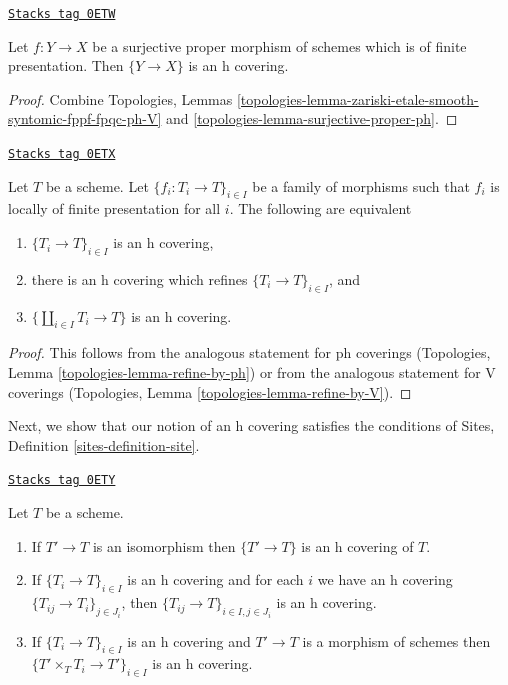 \begin{lemma}
\label{flat-lemma-surjective-proper-finite-presentation-h}
\href{https://stacks.math.columbia.edu/tag/0ETW}{\texttt{Stacks tag 0ETW}}

Let $f : Y \to X$ be a surjective proper morphism of schemes
which is of finite presentation. Then $\{Y \to X\}$ is an h covering.
\end{lemma}

\begin{proof}
Combine Topologies, Lemmas
\ref{topologies-lemma-zariski-etale-smooth-syntomic-fppf-fpqc-ph-V} and
\ref{topologies-lemma-surjective-proper-ph}.
\end{proof}

\begin{lemma}[Refine by h]
\label{flat-lemma-refine-by-h}
\href{https://stacks.math.columbia.edu/tag/0ETX}{\texttt{Stacks tag 0ETX}}

Let $T$ be a scheme. Let $\{f_i : T_i \to T\}_{i \in I}$ be a family
of morphisms such that $f_i$ is locally of finite presentation for all $i$.
The following are equivalent
\begin{enumerate}
\item $\{T_i \to T\}_{i \in I}$ is an h covering,
\item there is an h covering which refines $\{T_i \to T\}_{i \in I}$, and
\item $\{\coprod_{i \in I} T_i \to T\}$ is an h covering.
\end{enumerate}
\end{lemma}

\begin{proof}
This follows from the analogous statement for ph coverings
(Topologies, Lemma \ref{topologies-lemma-refine-by-ph})
or from the analogous statement for V coverings
(Topologies, Lemma \ref{topologies-lemma-refine-by-V}).
\end{proof}

Next, we show that our notion of an h covering satisfies the conditions of
Sites, Definition \ref{sites-definition-site}.

\begin{lemma}[H]
\label{flat-lemma-h}
\href{https://stacks.math.columbia.edu/tag/0ETY}{\texttt{Stacks tag 0ETY}}

Let $T$ be a scheme.
\begin{enumerate}
\item If $T' \to T$ is an isomorphism then $\{T' \to T\}$
is an h covering of $T$.
\item If $\{T_i \to T\}_{i\in I}$ is an h covering and for each
$i$ we have an h covering $\{T_{ij} \to T_i\}_{j\in J_i}$, then
$\{T_{ij} \to T\}_{i \in I, j\in J_i}$ is an h covering.
\item If $\{T_i \to T\}_{i\in I}$ is an h covering
and $T' \to T$ is a morphism of schemes then
$\{T' \times_T T_i \to T'\}_{i\in I}$ is an h covering.
\end{enumerate}
\end{lemma}

